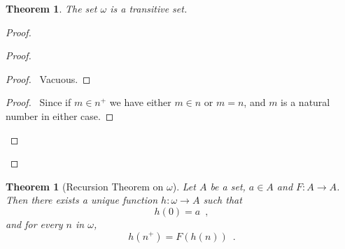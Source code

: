 \documentclass{article}
\let\qed\relax
\newtheorem{theorem}[axiom]{Theorem}
\theoremstyle{definition}
\begin{document}
    \begin{theorem}
        The set $\omega$ is a transitive set.
    \end{theorem}

    \begin{proof}
        \pf
        \begin{proof}
            \begin{proof}
                \pf\ Vacuous.
            \end{proof}
            \begin{proof}
                \pf\ Since if $m \in n^+$ we have either $m \in n$ or $m = n$, and $m$ is a natural number
                in either case.
            \end{proof}
        \end{proof}
        \qed
    \end{proof}

    \begin{theorem}[Recursion Theorem on $\omega$]
        Let $A$ be a set, $a \in A$ and $F : A \rightarrow A$. Then there exists a unique function
        $h : \omega \rightarrow A$ such that
        \[ h(0) = a \enspace , \]
        and for every $n$ in $\omega$,
        \[ h(n^+) = F(h(n)) \enspace . \]
    \end{theorem}
\end{document}

